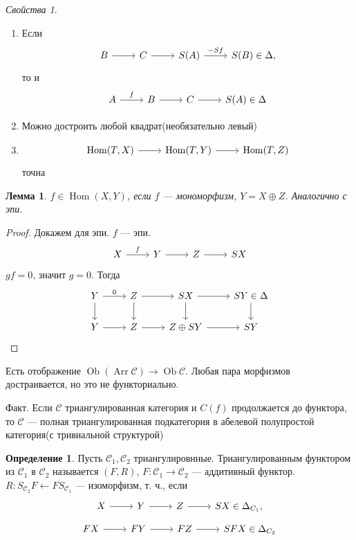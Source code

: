 \documentclass{article}
\newtheorem*{lemma}{Лемма}
\theoremstyle{definition}
\newtheorem*{definition}{Определение}
\theoremstyle{remark}
\newtheorem*{properties}{Свойства}
\DeclareMathOperator{\Hom}{Hom}
\DeclareMathOperator{\Ob}{Ob}
\DeclareMathOperator{\Arr}{Arr}
\newcommand{\Cat}{\mathcal{C}}
\newenvironment{enum}[2][\parindent]{\begin{enumerate}[nosep, wide, labelindent = #1, label=#2]}{\end{enumerate}}
\newenvironment{cd}{\begin{equation*}\begin{tikzcd}}{\end{tikzcd}\end{equation*}}
\begin{document}
\begin{properties} \leavevmode
    \begin{enum}{\arabic*)}
        \item Если
        \begin{cd}
            B \rar & C \rar & S(A) \rar["-Sf"] & S(B) \in \Delta,
        \end{cd}
        то и
        \begin{cd}
            A \rar["f"] & B \rar & C \rar & S(A) \in \Delta
        \end{cd}
        \item Можно достроить любой квадрат(необязательно левый)
        \item 
        \begin{cd}
        \Hom(T, X) \rar & \Hom(T, Y) \rar & \Hom(T, Z)
        \end{cd}
        точна
    \end{enum}
\end{properties}

\begin{lemma}
    $f \in \Hom(X, Y)$, если $f$ --- мономорфизм, $Y = X \oplus Z$. Аналогично с эпи.
\end{lemma}
\begin{proof}
    Докажем для эпи. $f$ --- эпи.
    \begin{cd}
        X \rar["f"] & Y \rar & Z \rar & SX
    \end{cd}
    $gf = 0$, значит $g = 0$. Тогда 
    \begin{cd}
        Y \rar["0"] \dar & Z \rar \dar & SX \rar \dar & SY \dar \in \Delta \\
        Y \rar & Z \rar & Z \oplus SY \rar & SY
    \end{cd}
\end{proof}

Есть отображение $\Ob(\Arr \Cat) \rightarrow \Ob \Cat$. Любая пара морфизмов достраивается, но это не функториально.

Факт. Если $\Cat$ триангулированная категория и $C(f)$ продолжается до функтора, то $\Cat$ --- полная триангулированная подкатегория в абелевой полупростой категория(с тривиальной структурой)

\begin{definition}
    Пусть $\Cat_1, \Cat_2$ триангулировнные. Триангулированным функтором из $\Cat_1$ в $\Cat_2$ называется $(F, R)$, $F: \Cat_1 \rightarrow \Cat_2$ --- аддитивный функтор. $R: S_{\Cat_2}F \leftarrow FS_{\Cat_1}$ --- изоморфизм, т. ч., если
    \begin{cd}
        X \rar & Y \rar & Z \rar & SX \in \Delta_{C_1},
    \end{cd}
    \begin{cd}
        FX \rar & FY \rar & FZ \rar & SFX \in \Delta_{C_2}
    \end{cd}
\end{definition}
\end{document}
